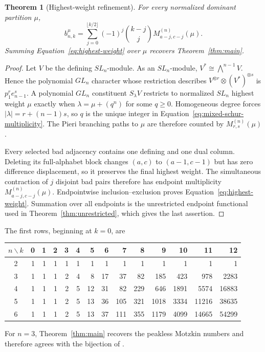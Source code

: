 \documentclass[11pt]{article}
\newtheorem{theorem}{Theorem}[section]
\theoremstyle{definition}
\begin{document}
\begin{theorem}[Highest-weight refinement]\label{thm:highest-weight}
For every normalized dominant partition $\mu$,
\begin{equation}\label{eq:highest-weight}
 \boxed{
 b_{n,k}^{\mu}=
 \sum_{j=0}^{\lfloor k/2\rfloor}(-1)^j\binom{k-j}{j}
 M_{a-j,c-j}^{(n)}(\mu).}
\end{equation}
Summing Equation~\eqref{eq:highest-weight} over $\mu$ recovers
Theorem~\ref{thm:main}.
\end{theorem}

\begin{proof}
Let $V$ be the defining $SL_n$-module.  As an $SL_n$-module,
$V^*\cong\bigwedge^{n-1}V$.  Hence the polynomial $GL_n$ character whose
restriction describes $V^{\otimes r}\otimes(V^*)^{\otimes s}$ is
$p_1^r e_{n-1}^s$.  A polynomial $GL_n$ constituent $S_\lambda V$ restricts
to normalized $SL_n$ highest weight $\mu$ exactly when
$\lambda=\mu+(q^n)$ for some $q\ge0$.  Homogeneous degree forces
$|\lambda|=r+(n-1)s$, so $q$ is the unique integer in
Equation~\eqref{eq:mixed-schur-multiplicity}.  The Pieri branching paths to
$\mu$ are therefore counted by $M_{r,s}^{(n)}(\mu)$
\cite{StanleyEC2}.

Every selected bad adjacency contains one defining and one dual column.
Deleting its full-alphabet block changes $(a,c)$ to $(a-1,c-1)$ but has zero
difference displacement, so it preserves the final highest weight.  The
simultaneous contraction of $j$ disjoint bad pairs therefore has endpoint
multiplicity $M_{a-j,c-j}^{(n)}(\mu)$.  Endpointwise inclusion--exclusion
proves Equation~\eqref{eq:highest-weight}.  Summation over all endpoints is
the unrestricted endpoint functional used in Theorem~\ref{thm:unrestricted},
which gives the last assertion.
\end{proof}

The first rows, beginning at $k=0$, are
\begin{center}
\small
\begin{tabular}{c|rrrrrrrrrrrrr}
\toprule
$n\backslash k$&0&1&2&3&4&5&6&7&8&9&10&11&12\\
\midrule
2&1&1&1&1&1&1&1&1&1&1&1&1&1\\
3&1&1&1&2&4&8&17&37&82&185&423&978&2283\\
4&1&1&1&2&5&12&31&82&229&646&1891&5574&16883\\
5&1&1&1&2&5&13&36&105&321&1018&3334&11216&38635\\
6&1&1&1&2&5&13&37&111&355&1179&4099&14665&54299\\
\bottomrule
\end{tabular}
\end{center}
For $n=3$, Theorem~\ref{thm:main} recovers the peakless Motzkin numbers and
therefore agrees with the bijection of \cite{Tenn2026}.
\end{document}
